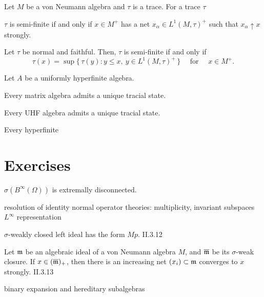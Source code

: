 \documentclass{../../large}
\begin{document}
\begin{prb}
Let $M$ be a von Neumann algebra and $\tau$ is a trace.
For a trace $\tau$
\begin{parts}
\item $\tau$ is semi-finite if and only if $x\in M^+$ has a net $x_\alpha\in L^1(M,\tau)^+$ such that $x_\alpha\uparrow x$ strongly.
\item Let $\tau$ be normal and faithful. Then, $\tau$ is semi-finite if and only if
\[\tau(x)=\sup\{\,\tau(y):y\le x,\ y\in L^1(M,\tau)^+\,\}\quad\text{ for }\quad x\in M^+.\]
\end{parts}
\end{prb}

\begin{prb}
Let $A$ be a uniformly hyperfinite algebra.
\begin{parts}
\item Every matrix algebra admits a unique tracial state.
\item Every UHF algebra admits a unique tracial state.
\item Every hyperfinite 
\end{parts}
\end{prb}





\section*{Exercises}
\begin{prb}
$\sigma(B^\infty(\Omega))$ is extremally disconnected.
\end{prb}

resolution of identity
normal operator theories: multiplicity, invariant subspaces
$L^\infty$ representation


$\sigma$-weakly closed left ideal has the form $Mp$. II.3.12

Let $\mathfrak{m}$ be an algebraic ideal of a von Neumann algebra $M$, and $\overline{\mathfrak{m}}$ be its $\sigma$-weak closure.
If $x\in(\overline{\mathfrak{m}})_+$, then there is an increasing net $(x_i)\subset\mathfrak{m}$ converges to $x$ strongly. II.3.13



binary expansion and hereditary subalgebras
\end{document}
